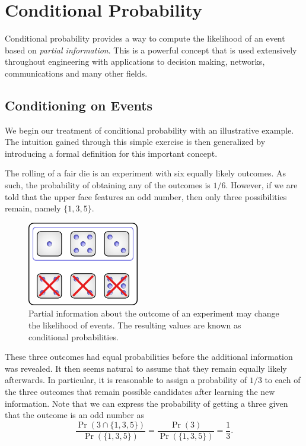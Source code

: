 \chapter{Conditional Probability}
\label{chapter:ConditionalProbability}

Conditional probability provides a way to compute the likelihood of an event based on \emph{partial information}.
This is a powerful concept that is used extensively throughout engineering with applications to decision making, networks, communications and many other fields.


\section{Conditioning on Events}

We begin our treatment of conditional probability with an illustrative example.
The intuition gained through this simple exercise is then generalized by introducing a formal definition for this important concept.

\begin{example}
The rolling of a fair die is an experiment with six equally likely outcomes.
As such, the probability of obtaining any of the outcomes is $1/6$.
However, if we are told that the upper face features an odd number, then only three possibilities remain, namely $\{1, 3, 5 \}$.

\begin{figure}[htb!]
\begin{center}
\begin{psfrags}
\includegraphics[height=3.675cm]{Figures/3Chapter/condevent}
\end{psfrags}
\caption{Partial information about the outcome of an experiment may change the likelihood of events.
The resulting values are known as conditional probabilities.}
\label{figure:CondEvent}
\end{center}
\end{figure}

These three outcomes had equal probabilities before the additional information was revealed.
It then seems natural to assume that they remain equally likely afterwards.
In particular, it is reasonable to assign a probability of $1/3$ to each of the three outcomes that remain possible candidates after learning the new information.
Note that we can express the probability of getting a three given that the outcome is an odd number as
\begin{equation*}
\frac{\Pr (3 \cap \{ 1, 3, 5 \})}{\Pr (\{ 1, 3, 5 \} ) }
= \frac{\Pr(3)}{\Pr (\{1,3,5\})} = \frac{1}{3} .
\end{equation*}
\end{example}

